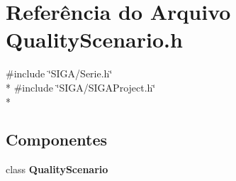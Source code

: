 \section{Referência do Arquivo Quality\+Scenario.\+h}
\label{_quality_scenario_8h}
{\ttfamily \#include \char`\"{}S\+I\+G\+A/\+Serie.\+h\char`\"{}}\\*
{\ttfamily \#include \char`\"{}S\+I\+G\+A/\+S\+I\+G\+A\+Project.\+h\char`\"{}}\\*
\subsection*{Componentes}
\begin{DoxyCompactItemize}
\item 
class {\bf Quality\+Scenario}
\end{DoxyCompactItemize}

